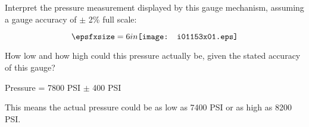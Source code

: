 

Interpret the pressure measurement displayed by this gauge mechanism, assuming a gauge accuracy of $\pm$ 2\% full scale:

$$\epsfxsize=6in \texttt{[image: i01153x01.eps]}$$

How low and how high could this pressure actually be, given the stated accuracy of this gauge?







Pressure = 7800 PSI $\pm$ 400 PSI
 
\vskip 10pt

This means the actual pressure could be as low as 7400 PSI or as high as 8200 PSI.











